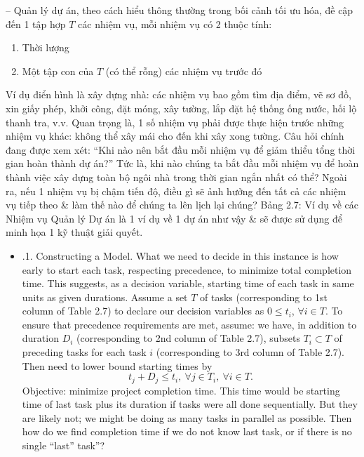 \documentclass{article}
\begin{document}
\begin{itemize}
\begin{itemize}
        -- Quản lý dự án, theo cách hiểu thông thường trong bối cảnh tối ưu hóa, đề cập đến 1 tập hợp $T$ các nhiệm vụ, mỗi nhiệm vụ có 2 thuộc tính:
        \begin{enumerate}
            \item Thời lượng
            \item Một tập con của $T$ (có thể rỗng) các nhiệm vụ trước đó
        \end{enumerate}
        Ví dụ điển hình là xây dựng nhà: các nhiệm vụ bao gồm tìm địa điểm, vẽ sơ đồ, xin giấy phép, khởi công, đặt móng, xây tường, lắp đặt hệ thống ống nước, hối lộ thanh tra, v.v. Quan trọng là, 1 số nhiệm vụ phải được thực hiện trước những nhiệm vụ khác: không thể xây mái cho đến khi xây xong tường. Câu hỏi chính đang được xem xét: ``Khi nào nên bắt đầu mỗi nhiệm vụ để giảm thiểu tổng thời gian hoàn thành dự án?'' Tức là, khi nào chúng ta bắt đầu mỗi nhiệm vụ để hoàn thành việc xây dựng toàn bộ ngôi nhà trong thời gian ngắn nhất có thể? Ngoài ra, nếu 1 nhiệm vụ bị chậm tiến độ, điều gì sẽ ảnh hưởng đến tất cả các nhiệm vụ tiếp theo \& làm thế nào để chúng ta lên lịch lại chúng? {\sf Bảng 2.7: Ví dụ về các Nhiệm vụ Quản lý Dự án} là 1 ví dụ về 1 dự án như vậy \& sẽ được sử dụng để minh họa 1 kỹ thuật giải quyết.
        \begin{itemize}
            \item {.1. Constructing a Model.} What we need to decide in this instance is how early to start each task, respecting precedence, to minimize total completion time. This suggests, as a decision variable, starting time of each task in same units as given durations. Assume a set $T$ of tasks (corresponding to 1st column of Table 2.7) to declare our decision variables as $0\le t_i$, $\forall i\in T$. To ensure that precedence requirements are met, assume: we have, in addition to duration $D_i$ (corresponding to 2nd column of Table 2.7), subsets $T_i\subset T$ of preceding tasks for each task $i$ (corresponding to 3rd column of Table 2.7). Then need to lower bound starting times by
            \begin{equation*}
                t_j + D_j\le t_i,\ \forall j\in T_i,\ \forall i\in T.
            \end{equation*}
            Objective: minimize project completion time. This time would be starting time of last task plus its duration if tasks were all done sequentially. But they are likely not; we might be doing as many tasks in parallel as possible. Then how do we find completion time if we do not know last task, or if there is no single ``last'' task''?


\end{itemize}
\end{itemize}
\end{itemize}
\end{document}
